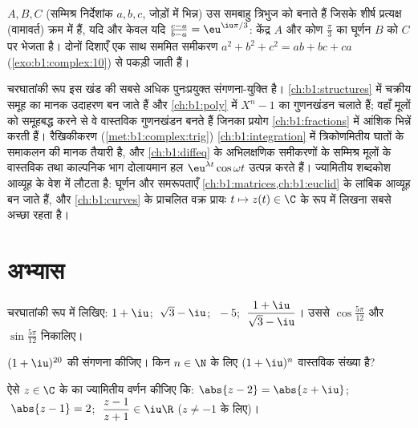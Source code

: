 \begin{example}\label{ex:b1:complex:equilateral}
$A, B, C$ (सम्मिश्र निर्देशांक $a, b, c$, जोड़ों में भिन्न) उस समबाहु
त्रिभुज को बनाते हैं जिसके शीर्ष प्रत्यक्ष (वामावर्त) क्रम में हैं, यदि और
केवल यदि $\frac{c - a}{b - a} = \eu^{\iu\pi/3}$: केंद्र $A$ और कोण
$\frac\pi3$ का घूर्णन $B$ को $C$ पर भेजता है। दोनों दिशाएँ एक साथ सममित
समीकरण $a^2 + b^2 + c^2 = ab + bc + ca$ (\cref{exo:b1:complex:10}) से पकड़ी
जाती हैं।
\end{example}

\begin{remark}[यह अध्याय कहाँ काम आता है]\label{rem:b1:complex:whereused}
चरघातांकी रूप इस खंड की सबसे अधिक पुनःप्रयुक्त संगणना-युक्ति है। 
\cref{ch:b1:structures} में चक्रीय समूह का मानक उदाहरण बन जाते हैं और
\cref{ch:b1:poly} में $X^n - 1$ का गुणनखंडन चलाते हैं; वहाँ  मूलों
को समूहबद्ध करने से वे वास्तविक गुणनखंडन बनते हैं जिनका प्रयोग
\cref{ch:b1:fractions} में आंशिक भिन्नें करती हैं। रैखिकीकरण
(\cref{met:b1:complex:trig}) \cref{ch:b1:integration} में त्रिकोणमितीय घातों
के समाकलन की मानक तैयारी है, और \cref{ch:b1:diffeq} के अभिलक्षणिक समीकरणों
के सम्मिश्र मूलों के वास्तविक तथा काल्पनिक भाग दोलायमान हल $\eu^{\lambda
t}\cos\omega t$ उत्पन्न करते हैं। ज्यामितीय शब्दकोश आव्यूह के वेश में लौटता
है: घूर्णन और समरूपताएँ \cref{ch:b1:matrices,ch:b1:euclid} के लांबिक आव्यूह
बन जाते हैं, और \cref{ch:b1:curves} के प्राचलित वक्र प्रायः  $t
\mapsto z(t) \in \C$ के रूप में लिखना सबसे अच्छा रहता है।
\end{remark}

\section{अभ्यास}

\begin{exercise}[$\star$]\label{exo:b1:complex:1}
चरघातांकी रूप में लिखिए: $1 + \iu$; $\;\sqrt 3 - \iu$; $\;-5$; $\;\dfrac{1 +
\iu}{\sqrt 3 - \iu}$। उससे $\cos\frac{5\pi}{12}$ और $\sin\frac{5\pi}{12}$
निकालिए।
\end{exercise}

\begin{exercise}[$\star$]\label{exo:b1:complex:2}
$(1 + \iu)^{20}$ की संगणना कीजिए। किन $n \in \N$ के लिए $(1 + \iu)^n$
वास्तविक संख्या है?
\end{exercise}

\begin{exercise}[$\star$]\label{exo:b1:complex:3}
ऐसे $z \in \C$ के  का ज्यामितीय वर्णन कीजिए कि: $\abs{z - 2} = \abs{z
+ \iu}$; $\;\abs{z - 1} = 2$; $\;\dfrac{z - 1}{z + 1} \in \iu\R$ ($z \neq
-1$ के लिए)।
\end{exercise}

